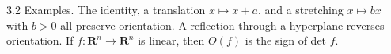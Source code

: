 3.2 Examples. The identity, a translation $x \mapsto x + a$, and a stretching $x \mapsto bx$ with $b > 0$ all preserve orientation. A reflection through a hyperplane reverses orientation. If $f: \mathbf{R}^n \rightarrow \mathbf{R}^n$ is linear, then $O(f)$ is the sign of det $f$.
